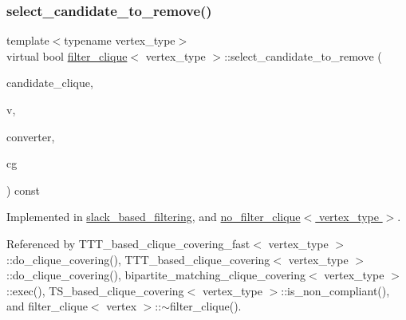 \subsubsection{\texorpdfstring{select\+\_\+candidate\+\_\+to\+\_\+remove()}{select\_candidate\_to\_remove()}}
{\footnotesize\ttfamily template$<$typename vertex\+\_\+type$>$ \\
virtual bool \hyperlink{structfilter__clique}{filter\+\_\+clique}$<$ vertex\+\_\+type $>$\+::select\+\_\+candidate\+\_\+to\+\_\+remove (\begin{DoxyParamCaption}\item[{const \hyperlink{classCustomOrderedSet}{Custom\+Ordered\+Set}$<$ \hyperlink{clique__covering__graph_8hpp_a9cb45047ea8c5ed95a8cfa90494345aa}{C\+\_\+vertex} $>$ \&}]{candidate\+\_\+clique,  }\item[{\hyperlink{clique__covering__graph_8hpp_a9cb45047ea8c5ed95a8cfa90494345aa}{C\+\_\+vertex} \&}]{v,  }\item[{const std\+::map$<$ \hyperlink{clique__covering__graph_8hpp_a9cb45047ea8c5ed95a8cfa90494345aa}{C\+\_\+vertex}, vertex\+\_\+type $>$ \&}]{converter,  }\item[{const \hyperlink{clique__covering__graph_8hpp_aa88e9419fe776ef37020cacd507cc4ad}{cc\+\_\+compatibility\+\_\+graph} \&}]{cg }\end{DoxyParamCaption}) const\hspace{0.3cm}{\ttfamily [pure virtual]}}



Implemented in \hyperlink{structslack__based__filtering_aae278a39030283f377963834005d2ed0}{slack\+\_\+based\+\_\+filtering}, and \hyperlink{structno__filter__clique_a61a430e7a7c41359fcb7a4624cba423e}{no\+\_\+filter\+\_\+clique$<$ vertex\+\_\+type $>$}.



Referenced by T\+T\+T\+\_\+based\+\_\+clique\+\_\+covering\+\_\+fast$<$ vertex\+\_\+type $>$\+::do\+\_\+clique\+\_\+covering(), T\+T\+T\+\_\+based\+\_\+clique\+\_\+covering$<$ vertex\+\_\+type $>$\+::do\+\_\+clique\+\_\+covering(), bipartite\+\_\+matching\+\_\+clique\+\_\+covering$<$ vertex\+\_\+type $>$\+::exec(), T\+S\+\_\+based\+\_\+clique\+\_\+covering$<$ vertex\+\_\+type $>$\+::is\+\_\+non\+\_\+compliant(), and filter\+\_\+clique$<$ vertex $>$\+::$\sim$filter\+\_\+clique().

